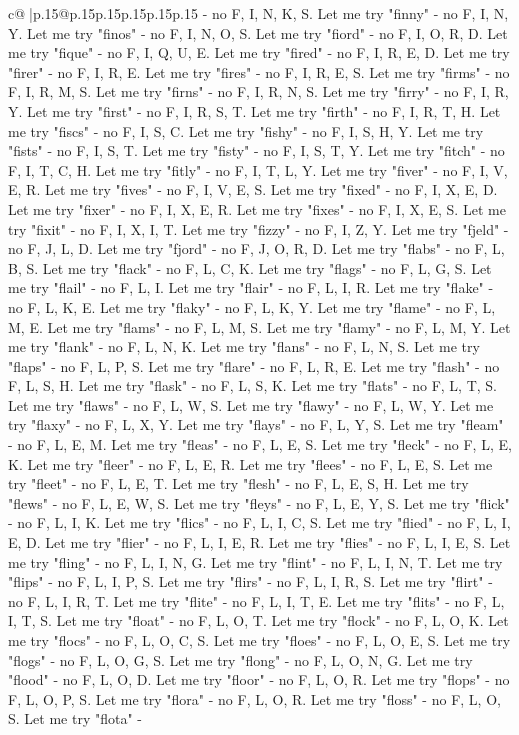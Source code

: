 \documentclass{article}
\begin{document}
{\begin{supertabular}{c@{$\;$}|p{.15\linewidth}@{}p{.15\linewidth}p{.15\linewidth}p{.15\linewidth}p{.15\linewidth}p{.15\linewidth}}
{{{{-} no F, I, N, K, S. Let me try "finny" {-} no F, I, N, Y. Let me try "finos" {-} no F, I, N, O, S. Let me try "fiord" {-} no F, I, O, R, D. Let me try "fique" {-} no F, I, Q, U, E. Let me try "fired" {-} no F, I, R, E, D. Let me try "firer" {-} no F, I, R, E. Let me try "fires" {-} no F, I, R, E, S. Let me try "firms" {-} no F, I, R, M, S. Let me try "firns" {-} no F, I, R, N, S. Let me try "firry" {-} no F, I, R, Y. Let me try "first" {-} no F, I, R, S, T. Let me try "firth" {-} no F, I, R, T, H. Let me try "fiscs" {-} no F, I, S, C. Let me try "fishy" {-} no F, I, S, H, Y. Let me try "fists" {-} no F, I, S, T. Let me try "fisty" {-} no F, I, S, T, Y. Let me try "fitch" {-} no F, I, T, C, H. Let me try "fitly" {-} no F, I, T, L, Y. Let me try "fiver" {-} no F, I, V, E, R. Let me try "fives" {-} no F, I, V, E, S. Let me try "fixed" {-} no F, I, X, E, D. Let me try "fixer" {-} no F, I, X, E, R. Let me try "fixes" {-} no F, I, X, E, S. Let me try "fixit" {-} no F, I, X, I, T. Let me try "fizzy" {-} no F, I, Z, Y. Let me try "fjeld" {-} no F, J, L, D. Let me try "fjord" {-} no F, J, O, R, D. Let me try "flabs" {-} no F, L, B, S. Let me try "flack" {-} no F, L, C, K. Let me try "flags" {-} no F, L, G, S. Let me try "flail" {-} no F, L, I. Let me try "flair" {-} no F, L, I, R. Let me try "flake" {-} no F, L, K, E. Let me try "flaky" {-} no F, L, K, Y. Let me try "flame" {-} no F, L, M, E. Let me try "flams" {-} no F, L, M, S. Let me try "flamy" {-} no F, L, M, Y. Let me try "flank" {-} no F, L, N, K. Let me try "flans" {-} no F, L, N, S. Let me try "flaps" {-} no F, L, P, S. Let me try "flare" {-} no F, L, R, E. Let me try "flash" {-} no F, L, S, H. Let me try "flask" {-} no F, L, S, K. Let me try "flats" {-} no F, L, T, S. Let me try "flaws" {-} no F, L, W, S. Let me try "flawy" {-} no F, L, W, Y. Let me try "flaxy" {-} no F, L, X, Y. Let me try "flays" {-} no F, L, Y, S. Let me try "fleam" {-} no F, L, E, M. Let me try "fleas" {-} no F, L, E, S. Let me try "fleck" {-} no F, L, E, K. Let me try "fleer" {-} no F, L, E, R. Let me try "flees" {-} no F, L, E, S. Let me try "fleet" {-} no F, L, E, T. Let me try "flesh" {-} no F, L, E, S, H. Let me try "flews" {-} no F, L, E, W, S. Let me try "fleys" {-} no F, L, E, Y, S. Let me try "flick" {-} no F, L, I, K. Let me try "flics" {-} no F, L, I, C, S. Let me try "flied" {-} no F, L, I, E, D. Let me try "flier" {-} no F, L, I, E, R. Let me try "flies" {-} no F, L, I, E, S. Let me try "fling" {-} no F, L, I, N, G. Let me try "flint" {-} no F, L, I, N, T. Let me try "flips" {-} no F, L, I, P, S. Let me try "flirs" {-} no F, L, I, R, S. Let me try "flirt" {-} no F, L, I, R, T. Let me try "flite" {-} no F, L, I, T, E. Let me try "flits" {-} no F, L, I, T, S. Let me try "float" {-} no F, L, O, T. Let me try "flock" {-} no F, L, O, K. Let me try "flocs" {-} no F, L, O, C, S. Let me try "floes" {-} no F, L, O, E, S. Let me try "flogs" {-} no F, L, O, G, S. Let me try "flong" {-} no F, L, O, N, G. Let me try "flood" {-} no F, L, O, D. Let me try "floor" {-} no F, L, O, R. Let me try "flops" {-} no F, L, O, P, S. Let me try "flora" {-} no F, L, O, R. Let me try "floss" {-} no F, L, O, S. Let me try "flota" {-} }}}
\end{supertabular}}
\end{document}
